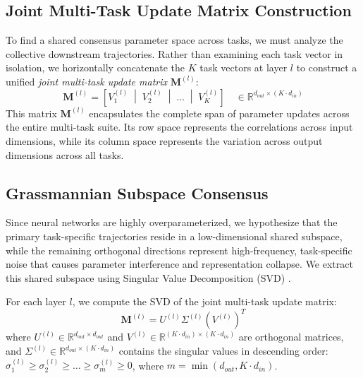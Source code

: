 \subsection{Joint Multi-Task Update Matrix Construction}
To find a shared consensus parameter space across tasks, we must analyze the collective downstream trajectories. Rather than examining each task vector in isolation, we horizontally concatenate the $K$ task vectors at layer $l$ to construct a unified \emph{joint multi-task update matrix} $\mathbf{M}^{(l)}$:
\begin{equation}
    \mathbf{M}^{(l)} = \left[ V_1^{(l)} \;\middle|\; V_2^{(l)} \;\middle|\; \dots \;\middle|\; V_K^{(l)} \right] \quad \in \mathbb{R}^{d_{out} \times (K \cdot d_{in})}
\end{equation}
This matrix $\mathbf{M}^{(l)}$ encapsulates the complete span of parameter updates across the entire multi-task suite. Its row space represents the correlations across input dimensions, while its column space represents the variation across output dimensions across all tasks.

\subsection{Grassmannian Subspace Consensus}
Since neural networks are highly overparameterized, we hypothesize that the primary task-specific trajectories reside in a low-dimensional shared subspace, while the remaining orthogonal directions represent high-frequency, task-specific noise that causes parameter interference and representation collapse. We extract this shared subspace using Singular Value Decomposition (SVD) \cite{golub1996matrix}.

For each layer $l$, we compute the SVD of the joint multi-task update matrix:
\begin{equation}
    \mathbf{M}^{(l)} = U^{(l)} \Sigma^{(l)} (V^{(l)})^T
\end{equation}
where $U^{(l)} \in \mathbb{R}^{d_{out} \times d_{out}}$ and $V^{(l)} \in \mathbb{R}^{(K \cdot d_{in}) \times (K \cdot d_{in})}$ are orthogonal matrices, and $\Sigma^{(l)} \in \mathbb{R}^{d_{out} \times (K \cdot d_{in})}$ contains the singular values in descending order: $\sigma_1^{(l)} \ge \sigma_2^{(l)} \ge \dots \ge \sigma_{m}^{(l)} \ge 0$, where $m = \min(d_{out}, K \cdot d_{in})$.

